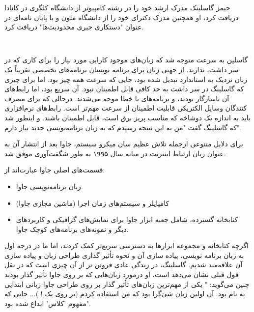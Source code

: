 \documentclass[a4paper,12pt]{report}
\begin{document}
\begin{center}
\begin{tcolorbox}[breakable]
		جیمز گاسلینک مدرک ارشد خود را در رشته کامپیوتر از دانشگاه کلگری 
		در کانادا دریافت کرد، او همچنین مدرک دکترای خود را از دانشگاه ملون و با پایان نامه‌ای در عنوان "دستکاری جبری محدودیت‌ها"
		 دریافت کرد.
		\end{tcolorbox}\\
		\begin{minipage}{0.9\linewidth}
	گاسلین به سرعت متوجه شد که زبان‌های موجود کارایی مورد نیاز را برای کاری که در سر داشت، ندارند. از جهتی زبان
	برای برنامه نویسان برنامه‌های تخصصی تقریباً یک زبان نزدیک به استاندارد تبدیل شده بود، جایی که سرعت همه چیز بود. اما 
	برای چیزی که گاسلینگ در سر داشت به حد کافی قابل اطمینان نبود. آن سریع بود، اما رابط‌های آن
	ناسازگار بودند، و برنامه‌های با خطا موجه می‌شدند. درحالی که برای مصرف کنندگان وسایل الکتریکی قابلیت اطمینان از سرعت مهم‌تر است.
	رابط‌های نرم‌افزاری باید به اندازه یک دوشاخه که مناسب پریز برق است، قابل اطمینان باشند. و اینطور شد که گاسلینگ گفت "من به این نتیجه رسیدم که به زبان برنامه‌نویسی جدید نیاز دارم".

		\end{minipage}
	\end{center}

	برای دلایل متنوعی ازجمله تلاش عظیم سان میکرو سیستم، ‌جاوا بعد از انتشار آن به عنوان زبان ارتباط اینترنت در میانه سال ۱۹۹۵ به طور شگفت‌آوری موفق شد.
	
	قسمت‌های اصلی جاوا عبارت‌اند از:
	
	\begin{itemize}[nosep]
		\renewcommand{\labelitemi}{\color{gray}\scriptsize$\blacksquare$}
		\item 
		زبان برنامه‌نویسی جاوا.
		\item
			کامپایلر و سیستم‌های زمان اجرا (ماشین مجازی جاوا)
		\item
		کتابخانه گسترده، شامل جعبه ابزار جاوا برای نمایش‌های گرافیکی و کاربرد‌های دیگر و نمونه‌های برنامه‌های کوچک جاوا.
	\end{itemize}

		اگرچه کتابخانه و مجموعه ابزارها به دسترسی سریع‌تر کمک کردند،‌ اما ما در درجه اول به زبان برنامه نویسی، پیاده سازی آن و نحوه تأثیر گذاری طراحی زبان و پیاده سازی آن علاقه‌مند شدیم.
	گاسلینگ،‌ در زندگی عادی فروتن تر از آن چیزی است که در نقل قول قبلی نشان می‌دهد است، او درمورد زبان‌هایی که بر روی جاوا تأثیر گذار بودند چنین می‌گوید: " یکی از مهم‌ترین زبان‌های تأثیر گذار بر روی طراحی جاوا زبانی ابتدایی به نام 
	\textit{}
	بود. آن اولین زبان شئ‌گرا بود که من استفاده کردم (بر روی یک 
	!
	)... جایی که مفهوم 'کلاس' ابداع شده بود".
	
\end{document}
